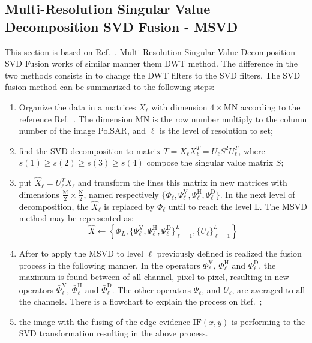 \documentclass[journal]{IEEEtran}
\begin{document}
\subsection{Multi-Resolution Singular Value Decomposition SVD Fusion - MSVD}
This section is based on Ref.~\cite{naidu}. Multi-Resolution Singular Value Decomposition SVD Fusion works of similar manner them DWT method.  The difference in the two methods consists in to change the DWT filters to the SVD filters. The SVD fusion method can be summarized to the following steps:
\begin{enumerate}
\item Organize the data in a matrices $X_\ell$ with dimension $4\times\text{MN}$ according to the reference Ref.~\cite{naidu}. The dimension MN is the row number multiply to the  column number of the image PolSAR, and $\ell$ is the level of resolution to set;  
\item find the SVD decomposition to matrix $T=X_\ell X_\ell^T=U_\ell S^2 U_\ell^T$, where $s(1)\geq s(2) \geq s(3) \geq s(4)$ compose the singular value matrix $S$;
\item put $\widehat{X}_\ell=U_\ell^TX_\ell$ and transform the lines this matrix in new matrices with dimensions $\frac{\text{M}}{2}\times\frac{\text{N}}{2}$, named respectively $\{\Phi_\ell, \Psi_\ell^\text{V}, \Psi_\ell^\text{H}, \Psi_\ell^\text{D}\}$. In the next level of decomposition, the $\widehat{X}_\ell$ is replaced by $\Phi_\ell$ until to reach the level L. The MSVD method may be represented as:
\begin{equation}\label{msvd_iter}
\widehat{X}\leftarrow \left\{\Phi_L,\{\Psi_\ell^\text{V},\Psi_\ell^\text{H},\Psi_\ell^\text{D} \}_{\ell=1}^L,\{U_\ell\}_{\ell=1}^L \right\}
\end{equation}
\item After to apply the MSVD to level $\ell$ previously defined is realized the fusion process in the following manner. In the operators $\Phi_\ell^\text{V}$, $\Phi_\ell^\text{H}$ and $\Phi_\ell^\text{D}$, the maximum is found between of all channel, pixel to pixel, resulting in new operators $\bar{\Phi}_\ell^\text{V}$, $\bar{\Phi}_\ell^\text{H}$ and $\bar{\Phi}_\ell^\text{D}$. The other operators $\Psi_\ell$, and $U_\ell$, are averaged to all the channels. There is a  flowchart to  explain the process on Ref.~\cite{naidu};
\item the image with the fusing of the edge evidence $\text{IF}(x,y)$ is performing to the SVD transformation resulting in the above process. 
\end{enumerate}
\end{document}
